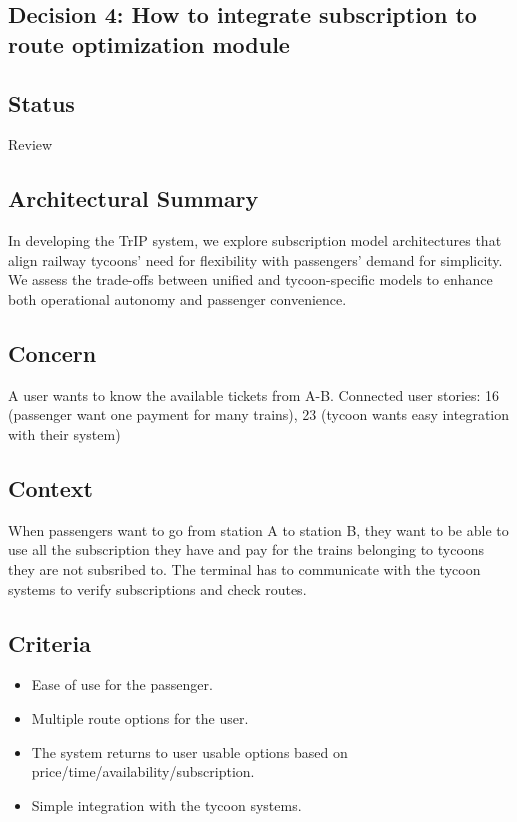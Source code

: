 \subsection{Decision 4: How to integrate subscription to route optimization module}

\subsection*{Status}
Review

\subsection*{Architectural Summary}
In developing the TrIP system, we explore subscription model architectures that align railway tycoons' need for flexibility with passengers' demand for simplicity. 
We assess the trade-offs between unified and tycoon-specific models to enhance both operational autonomy and passenger convenience.

\subsection*{Concern}
A user wants to know the available tickets from A-B. 
Connected user stories: 16 (passenger want one payment for many trains), 23 (tycoon wants easy integration with their system)

\subsection*{Context}
When passengers want to go from station A to station B, they want to be able to use all the subscription they have and pay for the trains belonging to tycoons they are not subsribed to.
The terminal has to communicate with the tycoon systems to verify subscriptions and check routes.

\subsection*{Criteria}
\begin{itemize}
\item Ease of use for the passenger.
\item Multiple route options for the user.
\item The system returns to user usable options based on price/time/availability/subscription.
\item Simple integration with the tycoon systems.
\end{itemize}

